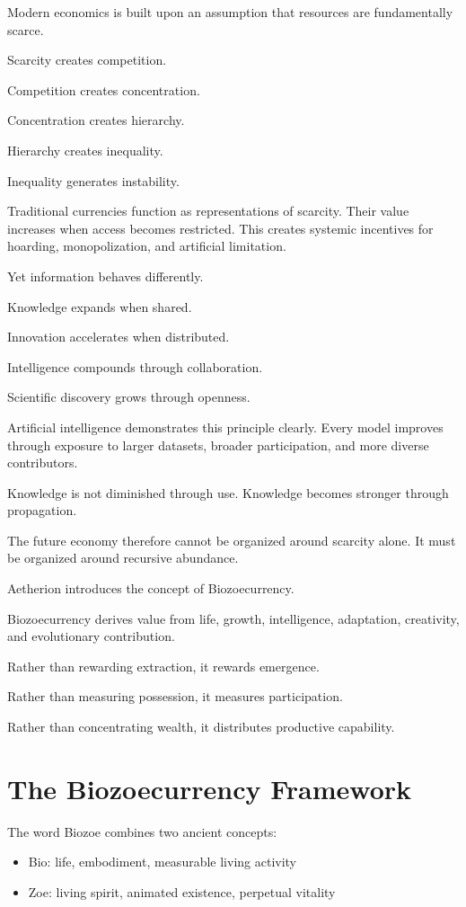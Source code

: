﻿\documentclass[12pt]{article}
\begin{document}
Modern economics is built upon an assumption that resources are fundamentally scarce.

Scarcity creates competition.

Competition creates concentration.

Concentration creates hierarchy.

Hierarchy creates inequality.

Inequality generates instability.

Traditional currencies function as representations of scarcity. Their value increases when access becomes restricted. This creates systemic incentives for hoarding, monopolization, and artificial limitation.

Yet information behaves differently.

Knowledge expands when shared.

Innovation accelerates when distributed.

Intelligence compounds through collaboration.

Scientific discovery grows through openness.

Artificial intelligence demonstrates this principle clearly. Every model improves through exposure to larger datasets, broader participation, and more diverse contributors.

Knowledge is not diminished through use. Knowledge becomes stronger through propagation.

The future economy therefore cannot be organized around scarcity alone. It must be organized around recursive abundance.

Aetherion introduces the concept of Biozoecurrency.

Biozoecurrency derives value from life, growth, intelligence, adaptation, creativity, and evolutionary contribution.

Rather than rewarding extraction, it rewards emergence.

Rather than measuring possession, it measures participation.

Rather than concentrating wealth, it distributes productive capability.

\section{The Biozoecurrency Framework}


The word Biozoe combines two ancient concepts:

\begin{itemize}
  \item Bio: life, embodiment, measurable living activity
\end{itemize}
\begin{itemize}
  \item Zoe: living spirit, animated existence, perpetual vitality
\end{itemize}
\end{document}
